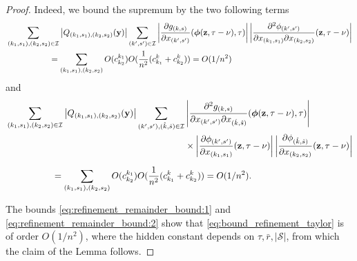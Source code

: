 \documentclass[acmsmall]{acmart}
\newcommand\by{\mathbf{y}}
\newcommand\bz{\mathbf{z}}
\newcommand\bphi{\text{\boldmath$\phi$}}
\newcommand\calI{\mathcal{I}}
\newcommand\calS{\mathcal{S}}
\newcommand\abs[1]{\left|#1\right|}         %
\begin{document}
\begin{proof}
Indeed, we bound the supremum by the two following terms
\begin{align}
&  \sum_{(k_1,s_1),(k_2,s_2)\in \calI} \abs{Q_{(k_1,s_1),(k_2,s_2)}(\by)}\sum_{(k',s') \in \calI} \abs{\frac{\partial g_{(k,s)}}{\partial x_{(k',s')}}(\bphi (\bz, \tau-\nu), \tau)} \abs{\frac{\partial^2 \phi_{(k',s')}}{\partial x_{(k_1,s_1)} \partial x_{(k_2,s_2)}}(\bz,\tau-\nu)} \nonumber\\
& \phantom{\sum_{(k_1,s_1),(k_2,s_2)}} = \sum_{(k_1,s_1),(k_2,s_2)} O(c^{k_1}_{k_2})O(\frac{1}{n^2}(c^k_{k_1} + c^k_{k_2})) = O(1/n^2) \label{eq:refinement_remainder_bound:1}
\end{align}
and
\begin{align}
& \sum_{(k_1,s_1),(k_2,s_2)\in\calI} \abs{Q_{(k_1,s_1),(k_2,s_2)}(\by)}\sum_{(k',s'), (\hat{k},\hat{s}) \in \calI} \abs{\frac{\partial^2  g_{(k,s)}}{\partial x_{(k',s')}\partial x_{(\hat{k},\hat{s})}}(\bphi (\bz, \tau-\nu),\tau)} \nonumber \\
& \phantom{\sum_{(k_1,s_1),(k_2,s_2)} \abs{Q_{(k_1,s_1),(k_2,s_2)}(z)}\sum_{(k',s'), (\hat{k},\hat{s}) \in \calI} \ldots}  \times \abs{\frac{\partial \phi_{(k',s')}}{\partial x_{(k_1,s_1)}}(\bz,\tau-\nu)} \abs{\frac{\partial \phi_{(\hat{k},\hat{s})}}{\partial x_{(k_2,s_2)}}(\bz,\tau-\nu)} \nonumber \\
&\phantom{\sum_{(k_1,s_1),(k_2,s_2)}} = \sum_{(k_1,s_1),(k_2,s_2)} O(c^{k_1}_{k_2})O(\frac{1}{n^2}(c^k_{k_1} + c^k_{k_2})) = O(1/n^2). \label{eq:refinement_remainder_bound:2}
\end{align}

The bounds \eqref{eq:refinement_remainder_bound:1} and \eqref{eq:refinement_remainder_bound:2} show that \eqref{eq:bound_refinement_taylor} is of order $O(1/n^2)$, where the hidden constant depends on $\tau, \bar{r}, \abs{\calS}$, from which the claim of the Lemma follows. \end{proof}


%
\end{document}
